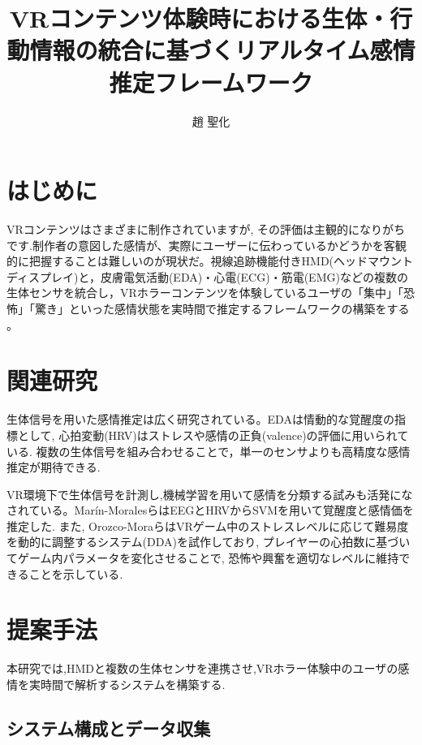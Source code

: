 \documentclass[paper=a4paper,fontsize=10pt,jafontscale=0.925,twocolumn]{jlreq}
\title{VRコンテンツ体験時における生体・行動情報の統合に基づくリアルタイム感情推定フレームワーク} %
\affiliation{人間システム工学科 井村研究室} %
\author{趙 聖化} %
\begin{document}
\maketitle


\section{はじめに}

VRコンテンツはさまざまに制作されていますが, その評価は主観的になりがちです.制作者の意図した感情が、実際にユーザーに伝わっているかどうかを客観的に把握することは難しいのが現状だ。視線追跡機能付きHMD(ヘッドマウントディスプレイ)と，皮膚電気活動(EDA)・心電(ECG)・筋電(EMG)などの複数の生体センサを統合し，VRホラーコンテンツを体験しているユーザの「集中」「恐怖」「驚き」といった感情状態を実時間で推定するフレームワークの構築をする 。

\section{関連研究}

生体信号を用いた感情推定は広く研究されている。EDAは情動的な覚醒度の指標として, 心拍変動(HRV)はストレスや感情の正負(valence)の評価に用いられている. 複数の生体信号を組み合わせることで，単一のセンサよりも高精度な感情推定が期待できる.

VR環境下で生体信号を計測し,機械学習を用いて感情を分類する試みも活発になされている。Marín-MoralesらはEEGとHRVからSVMを用いて覚醒度と感情価を推定した. また, Orozco-MoraらはVRゲーム中のストレスレベルに応じて難易度を動的に調整するシステム(DDA)を試作しており, プレイヤーの心拍数に基づいてゲーム内パラメータを変化させることで, 恐怖や興奮を適切なレベルに維持できることを示している.

\section{提案手法}

本研究では,HMDと複数の生体センサを連携させ,VRホラー体験中のユーザの感情を実時間で解析するシステムを構築する.

\subsection{システム構成とデータ収集}
\end{document}
